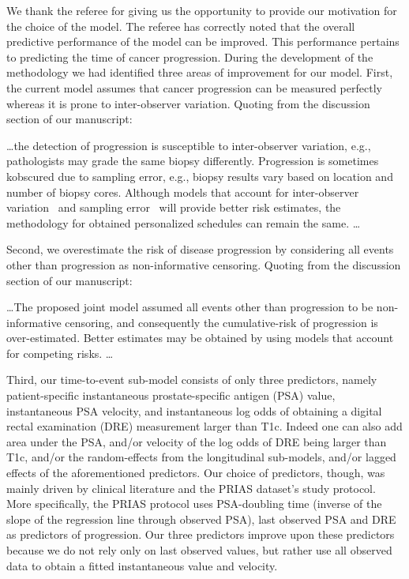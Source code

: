 \begin{enumerate}
We thank the referee for giving us the opportunity to provide our motivation for the choice of the model. The referee has correctly noted that the overall predictive performance of the model can be improved. This performance pertains to predicting the time of cancer progression. During the development of the methodology we had identified three areas of improvement for our model. First, the current model assumes that cancer progression can be measured perfectly whereas it is prone to inter-observer variation. Quoting from the discussion section of our manuscript: 
\begin{shadequote}
\ldots the detection of progression is susceptible to inter-observer variation, e.g., pathologists may grade the same biopsy differently. Progression is sometimes kobscured due to sampling error, e.g., biopsy results vary based on location and number of biopsy cores. Although models that account for inter-observer variation~\citep{balasubramanian2003estimation} and sampling error~\citep{coley2017prediction} will provide better risk estimates, the methodology for obtained personalized schedules can remain the same. \ldots
\end{shadequote}
Second, we overestimate the risk of disease progression by considering all events other than progression as non-informative censoring. Quoting from the discussion section of our manuscript:
\begin{shadequote}
\ldots The proposed joint model assumed all events other than progression to be non-informative censoring, and consequently the cumulative-risk of progression is over-estimated. Better estimates may be obtained by using models that account for competing risks. \ldots
\end{shadequote}
Third, our time-to-event sub-model consists of only three predictors, namely patient-specific instantaneous prostate-specific antigen (PSA) value, instantaneous PSA velocity, and instantaneous log odds of obtaining a digital rectal examination (DRE) measurement larger than T1c. Indeed one can also add area under the PSA, and/or velocity of the log odds of DRE being larger than T1c, and/or the random-effects from the longitudinal sub-models, and/or lagged effects of the aforementioned predictors. Our choice of predictors, though, was mainly driven by clinical literature and the PRIAS dataset's study protocol. More specifically, the PRIAS protocol uses PSA-doubling time (inverse of the slope of the regression line through observed PSA), last observed PSA and DRE as predictors of progression. Our three predictors improve upon these predictors because we do not rely only on last observed values, but rather use all observed data to obtain a fitted instantaneous value and velocity. 


\end{enumerate}
